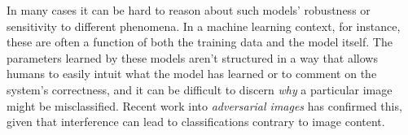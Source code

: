 \documentclass{mpaper}
\begin{document}
In many cases it can be hard to reason about such models' robustness or sensitivity to different phenomena.
In a machine learning context, for instance, these are often a function of both the training data and the model itself.
The parameters learned by these models aren't structured in a way that allows humans to easily intuit what the model has learned or to comment on the system's correctness, and it can be difficult to discern \textit{why} a particular image might be misclassified.
Recent work into \emph{adversarial images} \cite{AdversarialML} has confirmed this, given that interference can lead to classifications contrary to image content.

\end{document}
